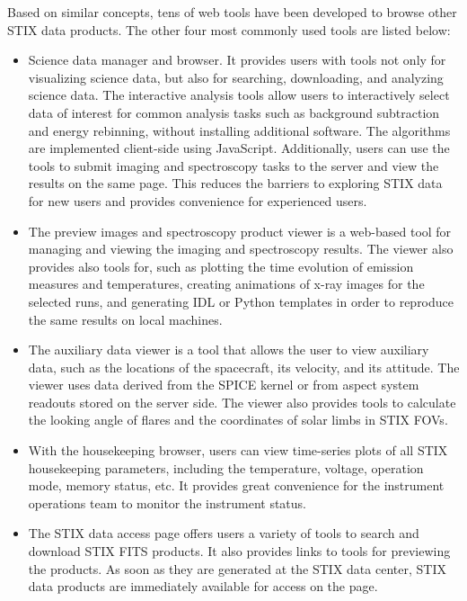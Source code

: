 \documentclass[referee]{aa} %
\begin{document}
Based on similar concepts, tens of web tools have been developed to browse other STIX data products.
The other four most commonly used tools are listed below: 
\begin{itemize}
  \item  Science data manager and browser.  It provides users with tools not only for visualizing science data, but also for searching, downloading, and analyzing science data. The interactive analysis tools allow users to interactively select data of interest for common analysis tasks such as background subtraction and energy rebinning,  without installing additional software. 
  The algorithms are implemented client-side using JavaScript. 
 Additionally, users can use the tools to submit imaging and spectroscopy tasks to the server and view the results on the same page. This reduces the barriers to exploring STIX data for new users and provides convenience for experienced users.

  \item  The preview images and spectroscopy product viewer is a web-based tool for managing and viewing the imaging and spectroscopy results. The viewer also provides also tools for, such as plotting the time evolution of emission measures and temperatures,  creating animations of x-ray images for the selected runs, and generating IDL or Python templates in order to reproduce the same results on  local machines.
  \item The auxiliary data viewer is a tool that allows the user to view auxiliary data, such as the locations of the spacecraft, its velocity, and its attitude. The viewer uses data derived from the SPICE kernel or from aspect system readouts stored on the server side.  The viewer also provides tools to calculate the looking angle of flares and the coordinates of solar limbs in STIX FOVs.
  \item  With the housekeeping browser, users can view time-series plots of all STIX housekeeping parameters, including the temperature, voltage, operation mode, memory status, etc. It provides great convenience for the instrument operations team to monitor the instrument status. 
\item 
The STIX data access page offers users a variety of tools to search and download STIX FITS products. 
It also provides links to tools for previewing the products. As soon as they are generated at the STIX data center, STIX data products are immediately available for access on the page.
\end{itemize}
\end{document}
